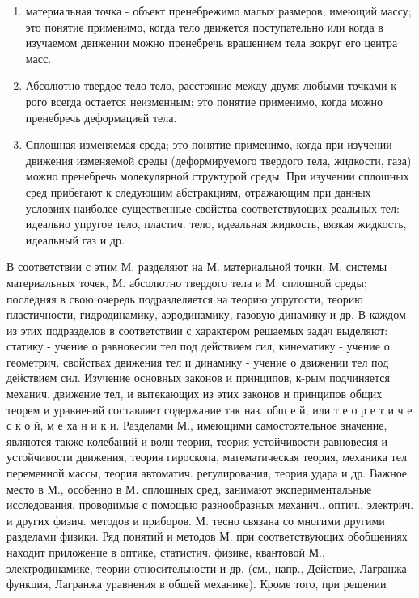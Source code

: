 \documentclass[10pt]{article}
\begin{document}
\begin{enumerate}

  \item материальная точка - объект пренебрежимо малых размеров, имеющий массу; это понятие применимо, когда тело движется поступательно или когда в изучаемом движении можно пренебречь врашением тела вокруг его центра масс.



  \item Абсолютно твердое тело-тело, расстояние между двумя любыми точками к-рого всегда остается неизменным; это понятие применимо, когда можно пренебречь деформацией тела.



  \item Сплошная изменяемая среда; это понятие применимо, когда при изучении движения изменяемой среды (деформируемого твердого тела, жидкости, газа) можно пренебречь молекулярной структурой среды. При изучении сплошных сред прибегают к следующим абстракциям, отражающим при данных условиях наиболее существенные свойства соответствующих реальных тел: идеально упругое тело, пластич. тело, идеальная жидкость, вязкая жидкость, идеальный газ и др.



\end{enumerate}



В соответствии с этим М. разделяют на М. материальной точки, М. системы материальных точек, М. абсолютно твердого тела и М. сплошной среды; последняя в свою очередь подразделяется на теорию упругости, теорию пластичности, гидродинамику, аэродинамику, газовую динамику и др. В каждом из этих подразделов в соответствии с характером решаемых задач выделяют: статику - учение о равновесии тел под действием сил, кинематику - учение о геометрич. свойствах движения тел и динамику - учение о движении тел под действием сил. Изучение основных законов и принципов, к-рым подчиняется механич. движение тел, и вытекающих из этих законов и принципов общих теорем и уравнений составляет содержание так наз. общ е й, или т е о р е т и ч е с к о й, м е ха н и к и. Разделами М., имеющими самостоятельное значение, являются также колебаний и волн теория, теория устойчивости равновесия и устойчивости движения, теория гироскопа, математическая теория, механика тел переменной массы, теория автоматич. регулирования, теория удара и др. Важное место в М., особенно в М. сплошных сред, занимают экспериментальные исследования, проводимые с помощью разнообразных механич., оптич., электрич. и других физич. методов и приборов. М. тесно связана со многими другими разделами физики. Ряд понятий и методов М. при соответствующих обобщениях находит приложение в оптике, статистич. физике, квантовой М., электродинамике, теории относительности и др. (см., напр., Действие, Лагранжа функция, Лагранжа уравнения в общей механике). Кроме того, при решении
\end{document}
